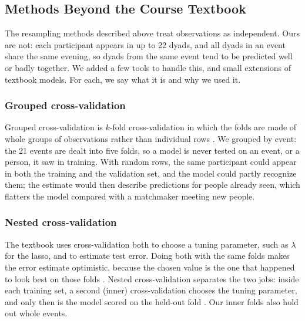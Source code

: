 
\subsection{Methods Beyond the Course Textbook}
\label{sec:beyond}

The resampling methods described above treat observations as independent. Ours are not: each participant
appears in up to 22 dyads, and all dyads in an event share the same evening, so dyads from the same event tend to be
predicted well or badly together. We added a few tools to handle this, and small extensions of textbook models. For
each, we say what it is and why we used it.

\subsubsection{Grouped cross-validation}
Grouped cross-validation is $k$-fold cross-validation \cite[Section 5.1.3, pp.~206--208]{James:2023} in which the folds are
made of whole groups of observations rather than individual rows \cite[pp.~917, 919]{Roberts:2017}. We grouped by event:
the 21 events are dealt into five folds, so a model is never tested on an event, or a person, it saw in training. With
random rows, the same participant could appear in both the training and the validation set, and the model could
partly recognize them; the estimate would then describe predictions for people already seen, which flatters the
model compared with a matchmaker meeting new people.

\subsubsection{Nested cross-validation}
The textbook uses cross-validation both to choose a tuning parameter, such as $\lambda$ for the lasso, and to estimate
test error. Doing both with the same folds makes the error estimate optimistic, because the chosen value is the one
that happened to look best on those folds \cite{Varma:2006}. Nested cross-validation separates the two jobs: inside each
training set, a second (inner) cross-validation chooses the tuning parameter, and only then is the model scored on
the held-out fold \cite[Section 7.10.2, pp.~245--247]{Hastie:2009}. Our inner folds also hold out whole events.

